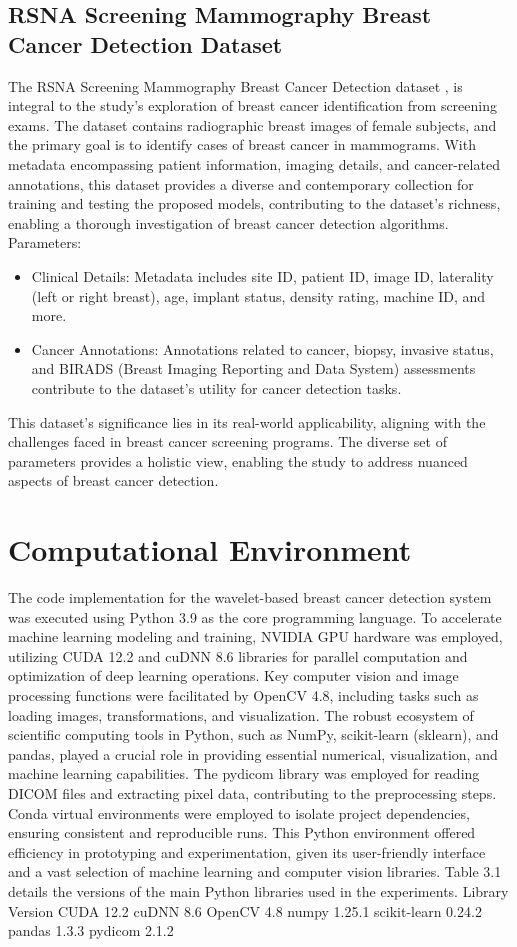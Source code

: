 \subsection{RSNA Screening Mammography Breast Cancer Detection Dataset}
The RSNA Screening Mammography Breast Cancer Detection dataset \cite{RSNA}, is integral to the study's exploration of breast cancer identification from screening exams. The dataset contains radiographic breast images of female subjects, and the primary goal is to identify cases of breast cancer in mammograms. With metadata encompassing patient information, imaging details, and cancer-related annotations, this dataset provides a diverse and contemporary collection for training and testing the proposed models, contributing to the dataset's richness, enabling a thorough investigation of breast cancer detection algorithms.
\\ Parameters:
\begin{itemize}
  \item Clinical Details: Metadata includes site ID, patient ID, image ID, laterality (left or right breast), age, implant status, density rating, machine ID, and more.
  \item Cancer Annotations: Annotations related to cancer, biopsy, invasive status, and BIRADS (Breast Imaging Reporting and Data System) assessments contribute to the dataset's utility for cancer detection tasks.
\end{itemize}
This dataset's significance lies in its real-world applicability, aligning with the challenges faced in breast cancer screening programs. The diverse set of parameters provides a holistic view, enabling the study to address nuanced aspects of breast cancer detection.
\section{Computational Environment}
The code implementation for the wavelet-based breast cancer detection system was executed using Python 3.9 as the core programming language. To accelerate machine learning modeling and training, NVIDIA GPU hardware was employed, utilizing CUDA 12.2 and cuDNN 8.6 libraries for parallel computation and optimization of deep learning operations. Key computer vision and image processing functions were facilitated by OpenCV 4.8, including tasks such as loading images, transformations, and visualization. The robust ecosystem of scientific computing tools in Python, such as NumPy, scikit-learn (sklearn), and pandas, played a crucial role in providing essential numerical, visualization, and machine learning capabilities. The pydicom library was employed for reading DICOM files and extracting pixel data, contributing to the preprocessing steps. Conda virtual environments were employed to isolate project dependencies, ensuring consistent and reproducible runs. This Python environment offered efficiency in prototyping and experimentation, given its user-friendly interface and a vast selection of machine learning and computer vision libraries. Table 3.1 details the versions of the main Python libraries used in the experiments.
Library Version
CUDA 12.2
cuDNN 8.6
OpenCV 4.8
numpy 1.25.1
scikit-learn 0.24.2
pandas 1.3.3
pydicom 2.1.2
